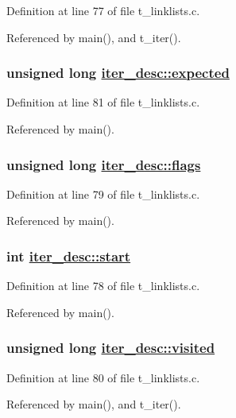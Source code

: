 Definition at line 77 of file t\_\-linklists.c.

Referenced by main(), and t\_\-iter().\hypertarget{structiter__desc_o5}{
\subsubsection[expected]{\setlength{\rightskip}{0pt plus 5cm}unsigned long \hyperlink{structiter__desc_o5}{iter\_\-desc::expected}}}
\label{structiter__desc_o5}




Definition at line 81 of file t\_\-linklists.c.

Referenced by main().\hypertarget{structiter__desc_o3}{
\subsubsection[flags]{\setlength{\rightskip}{0pt plus 5cm}unsigned long \hyperlink{structiter__desc_o3}{iter\_\-desc::flags}}}
\label{structiter__desc_o3}




Definition at line 79 of file t\_\-linklists.c.

Referenced by main().\hypertarget{structiter__desc_o2}{
\subsubsection[start]{\setlength{\rightskip}{0pt plus 5cm}int \hyperlink{structiter__desc_o2}{iter\_\-desc::start}}}
\label{structiter__desc_o2}




Definition at line 78 of file t\_\-linklists.c.

Referenced by main().\hypertarget{structiter__desc_o4}{
\subsubsection[visited]{\setlength{\rightskip}{0pt plus 5cm}unsigned long \hyperlink{structiter__desc_o4}{iter\_\-desc::visited}}}
\label{structiter__desc_o4}




Definition at line 80 of file t\_\-linklists.c.

Referenced by main(), and t\_\-iter().